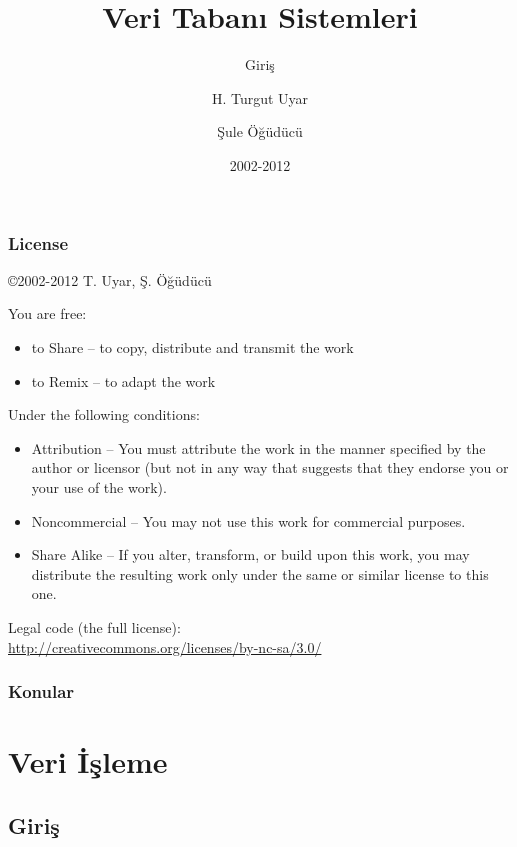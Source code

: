 \documentclass[dvipsnames]{beamer}
\title{Veri Tabanı Sistemleri}
\subtitle{Giriş}
\author{H. Turgut Uyar \and Şule Öğüdücü}
\date{2002-2012}
\theoremstyle{definition}
\theoremstyle{example}
\theoremstyle{plain}
\begin{document}
\begin{frame}
  \titlepage
\end{frame}

\begin{frame}
  \frametitle{License}

  \hfill
  \copyright 2002-2012 T. Uyar, Ş. Öğüdücü

  \vfill
  \begin{tiny}
    You are free:
    \begin{itemize}
      \item to Share -- to copy, distribute and transmit the work
      \item to Remix -- to adapt the work
    \end{itemize}

    Under the following conditions:
    \begin{itemize}
      \item Attribution -- You must attribute the work in the manner specified by
        the author or licensor (but not in any way that suggests that they
        endorse you or your use of the work).

      \item Noncommercial -- You may not use this work for commercial purposes.

      \item Share Alike -- If you alter, transform, or build upon this work, you
        may distribute the resulting work only under the same or similar license
        to this one.
    \end{itemize}
  \end{tiny}

  \vfill
  Legal code (the full license):\\
  \url{http://creativecommons.org/licenses/by-nc-sa/3.0/}
\end{frame}

\begin{frame}
  \frametitle{Konular}
  \tableofcontents
\end{frame}

\section{Veri İşleme}

\subsection{Giriş}
\end{document}
